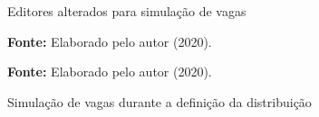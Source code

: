 \begin{figure}[ht!]
\centering

\caption{\textmd{Editores alterados para simulação de vagas}}
\label{fig:editoralterado}

\par\medskip\textbf{Fonte:} Elaborado pelo autor (2020). \par\medskip

\caption{\textmd{Simulação de vagas durante a definição da distribuição}}
\label{fig:simulacaovagas}

\par\medskip\textbf{Fonte:} Elaborado pelo autor (2020). \par\medskip

\end{figure}

